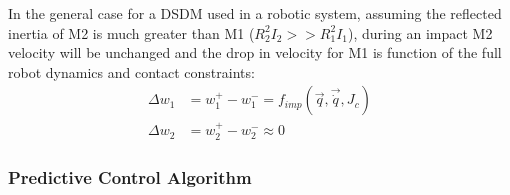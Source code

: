 In the general case for a DSDM used in a robotic system, assuming the reflected inertia of M2 is much greater than M1 ($R_2^2 I_2 >> R_1^2 I_1 $), during an impact M2 velocity will be unchanged and the drop in velocity for M1 is function of the full robot dynamics and contact constraints:
%
\begin{align}
\Delta w_1  &= w_1^+ - w_1^- = f_{imp}( \vec{q} , \vec{\dot{q}} , J_c ) \\
\Delta w_2  &= w_2^+ - w_2^- \approx 0
\label{eq:dsdm_impact_gen_delta_w1}
\end{align}
%

\subsubsection{Predictive Control Algorithm}

